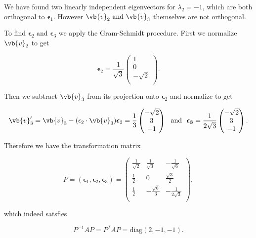 \documentclass[a4paper,12pt]{report}
\begin{document}
{We have found two linearly independent eigenvectors for \(\lambda _{2} = -1 \), which are both orthogonal to \(\boldsymbol{\epsilon }_{1}  \). However \(\vb{v} _{2} \text { and } \vb{v} _{3}  \) themselves are not orthogonal. 

To find \(\boldsymbol{\epsilon }_{2} \text { and } \boldsymbol{\epsilon }_{3}   \) we apply the Gram-Schmidt procedure. First we normalize \(\vb{v} _{2} \) to get 

\begin{equation}
    \boldsymbol{\epsilon }_{2} = \frac{1}{\sqrt{3} } \begin{pmatrix}
         1 \\
         0 \\
         -\sqrt{2}  \\
    \end{pmatrix}.   
\end{equation}

Then we subtract \(\vb{v} _{3} \) from its projection onto \(\boldsymbol{\epsilon }_{2}  \) and normalize to get 

\begin{equation}
    \vb{v} _{3}' = \vb{v} _{3} - (\epsilon _{2}\cdot \vb{v} _{3}  ) \boldsymbol{\epsilon }_{2} = \frac{1}{3} \begin{pmatrix}
         -\sqrt{2}  \\
         3 \\
         -1 \\
    \end{pmatrix} ~\text { and }~ \boldsymbol{\epsilon _{3} } = \frac{1}{2\sqrt{3} } \begin{pmatrix}
         -\sqrt{2}  \\
         3 \\
         -1 \\
    \end{pmatrix}.
\end{equation}

Therefore we have the transformation matrix 

\begin{equation}
    P = (\boldsymbol{\epsilon }_{1}, \boldsymbol{\epsilon }_{2},\boldsymbol{\epsilon }_{3}      ) = \begin{pmatrix}
        \frac{1}{\sqrt{2} }  & \frac{1}{\sqrt{3} }  & -\frac{1}{\sqrt{6} }   \\
        \frac{1}{2}  & 0 & \frac{\sqrt{3} }{2}   \\
        \frac{1}{2}  & -\frac{\sqrt{6}  }{3}  & -\frac{1}{2\sqrt{3} }   \\
    \end{pmatrix},
\end{equation}

which indeed satsfies 

\begin{equation}
    P^{-1} AP = P^TAP = \text{diag}  (2,-1,-1).
\end{equation}
~
} 
\end{document}
